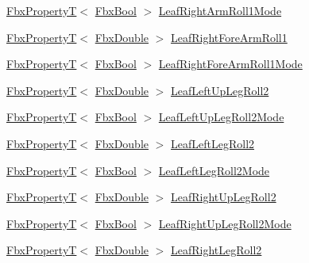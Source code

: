 \begin{DoxyCompactItemize}
\item 
\hyperlink{class_fbx_property_t}{Fbx\+PropertyT}$<$ \hyperlink{fbxtypes_8h_a92e0562b2fe33e76a242f498b362262e}{Fbx\+Bool} $>$ \hyperlink{class_fbx_character_af27b4ee5dfd8968fa5e11554eb9b4ae2}{Leaf\+Right\+Arm\+Roll1\+Mode}
\item 
\hyperlink{class_fbx_property_t}{Fbx\+PropertyT}$<$ \hyperlink{fbxtypes_8h_a171e72a1c46fc15c1a6c9c31948c1c5b}{Fbx\+Double} $>$ \hyperlink{class_fbx_character_a7f7a019b3eb58537713d44cbb3652d1b}{Leaf\+Right\+Fore\+Arm\+Roll1}
\item 
\hyperlink{class_fbx_property_t}{Fbx\+PropertyT}$<$ \hyperlink{fbxtypes_8h_a92e0562b2fe33e76a242f498b362262e}{Fbx\+Bool} $>$ \hyperlink{class_fbx_character_acf6a65fcc55fd8b93c2fcd3f5330ade7}{Leaf\+Right\+Fore\+Arm\+Roll1\+Mode}
\item 
\hyperlink{class_fbx_property_t}{Fbx\+PropertyT}$<$ \hyperlink{fbxtypes_8h_a171e72a1c46fc15c1a6c9c31948c1c5b}{Fbx\+Double} $>$ \hyperlink{class_fbx_character_ae4cff2fface397e9cc73e1a23e79c0d5}{Leaf\+Left\+Up\+Leg\+Roll2}
\item 
\hyperlink{class_fbx_property_t}{Fbx\+PropertyT}$<$ \hyperlink{fbxtypes_8h_a92e0562b2fe33e76a242f498b362262e}{Fbx\+Bool} $>$ \hyperlink{class_fbx_character_aec26440a6eb3ddf1451bca2a9c09ac21}{Leaf\+Left\+Up\+Leg\+Roll2\+Mode}
\item 
\hyperlink{class_fbx_property_t}{Fbx\+PropertyT}$<$ \hyperlink{fbxtypes_8h_a171e72a1c46fc15c1a6c9c31948c1c5b}{Fbx\+Double} $>$ \hyperlink{class_fbx_character_a96827678c049046c127540cb02c4107d}{Leaf\+Left\+Leg\+Roll2}
\item 
\hyperlink{class_fbx_property_t}{Fbx\+PropertyT}$<$ \hyperlink{fbxtypes_8h_a92e0562b2fe33e76a242f498b362262e}{Fbx\+Bool} $>$ \hyperlink{class_fbx_character_a0f212d39e322d52f7f9c24982d156e68}{Leaf\+Left\+Leg\+Roll2\+Mode}
\item 
\hyperlink{class_fbx_property_t}{Fbx\+PropertyT}$<$ \hyperlink{fbxtypes_8h_a171e72a1c46fc15c1a6c9c31948c1c5b}{Fbx\+Double} $>$ \hyperlink{class_fbx_character_a2fd8fc9434a1d6fe17374b5364970df8}{Leaf\+Right\+Up\+Leg\+Roll2}
\item 
\hyperlink{class_fbx_property_t}{Fbx\+PropertyT}$<$ \hyperlink{fbxtypes_8h_a92e0562b2fe33e76a242f498b362262e}{Fbx\+Bool} $>$ \hyperlink{class_fbx_character_a3b1902251d68b24342bd9a592c5378fe}{Leaf\+Right\+Up\+Leg\+Roll2\+Mode}
\item 
\hyperlink{class_fbx_property_t}{Fbx\+PropertyT}$<$ \hyperlink{fbxtypes_8h_a171e72a1c46fc15c1a6c9c31948c1c5b}{Fbx\+Double} $>$ \hyperlink{class_fbx_character_a33fdc7a31e65ce8815ac1d05cd333339}{Leaf\+Right\+Leg\+Roll2}

\end{DoxyCompactItemize}
